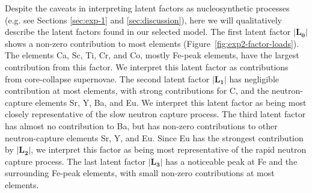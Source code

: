 \documentclass[twocolumn]{aastex62}
\newcommand{\todo}[1]{\textcolor{red}{#1}}
\begin{document}
Despite the caveats in interpreting latent factors as nucleosynthetic processes
(e.g. see Sections \ref{sec:exp-1} and \ref{sec:discussion}), here we will
qualitatively describe the latent factors found in our selected model.
The first latent factor $|\mathbf{L_0}|$ shows a non-zero contribution to most
elements (Figure~\ref{fig:exp2-factor-loads}). The elements Ca, Sc, Ti, Cr, and Co, mostly
Fe-peak elements, have the largest contribution from this factor. We interpret this latent
factor as contributions from core-collapse supernovae.
The second latent factor $|\mathbf{L_1}|$ has negligible contribution at most elements,
with strong contributions for C, and the neutron-capture elements Sr, Y, Ba, and Eu. We
interpret this latent factor as being most closely representative of the slow neutron
capture process. The third latent factor has almost no contribution to Ba, but has
non-zero contributions to other neutron-capture elements Sr, Y, and Eu. Since Eu has
the strongest contribution by $|\mathbf{L_2}|$, we interpret this factor as being most
representative of the rapid neutron capture process. The last latent factor $|\mathbf{L_3}|$
has a noticeable peak at Fe and the surrounding Fe-peak elements, with small non-zero contributions
at most elements. 

\end{document}
